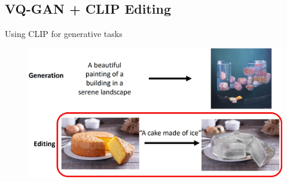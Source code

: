 \subsection{VQ-GAN + CLIP Editing}
\begin{frame}[allowframebreaks]{Using CLIP for generative tasks}
    \begin{figure}
        \centering
        \includegraphics[width=1\textwidth,height=0.9\textheight,keepaspectratio]{images/video/slide_62_1_img.jpg}
    \end{figure}
\end{frame}



